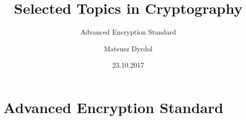 \documentclass[handout,compress]{beamer} %
\title{Selected Topics in Cryptography}
\subtitle{Advanced Encryption Standard}
\author[]{Mateusz Dyrdol}
\institute[KT AGH]{Department of Telecommunications}
\date{23.10.2017}
\begin{document}
	\begin{frame}
    	\titlepage
	\end{frame}


\renewcommand{\logosinfootline}{\raisebox{0.12cm}{\begin{beamercolorbox}{rafi}{Selected Topics in Cryptography \quad \insertframenumber/\inserttotalframenumber}\end{beamercolorbox}}}
\section{Advanced Encryption Standard} 


 

\end{document}
